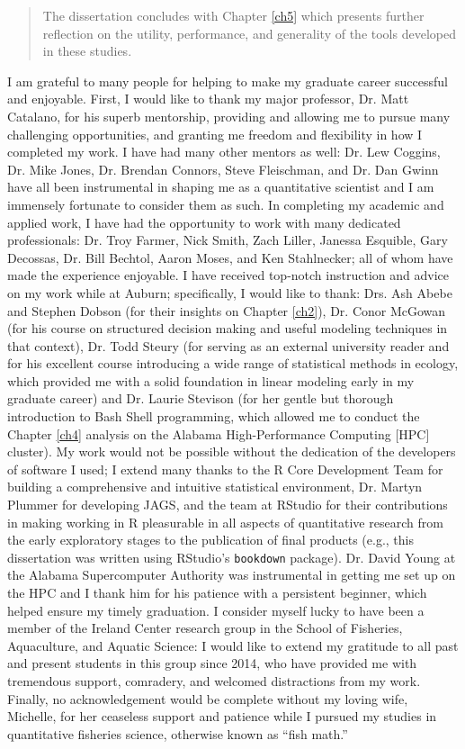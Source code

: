 \documentclass[12pt,]{book}
\theoremstyle{definition}
\theoremstyle{definition}
\theoremstyle{definition}
\theoremstyle{remark}
\begin{document}
\begin{romanpages}
\begin{abstract}
The dissertation concludes with Chapter \ref{ch5} which presents further reflection on the utility, performance, and generality of the tools developed in these studies.

\end{abstract}

\begin{acknowledgments}
\noindent
I am grateful to many people for helping to make my graduate career successful and enjoyable. First, I would like to thank my major professor, Dr. Matt Catalano, for his superb mentorship, providing and allowing me to pursue many challenging opportunities, and granting me freedom and flexibility in how I completed my work. I have had many other mentors as well: Dr. Lew Coggins, Dr. Mike Jones, Dr. Brendan Connors, Steve Fleischman, and Dr. Dan Gwinn have all been instrumental in shaping me as a quantitative scientist and I am immensely fortunate to consider them as such. In completing my academic and applied work, I have had the opportunity to work with many dedicated professionals: Dr. Troy Farmer, Nick Smith, Zach Liller, Janessa Esquible, Gary Decossas, Dr. Bill Bechtol, Aaron Moses, and Ken Stahlnecker; all of whom have made the experience enjoyable. I have received top-notch instruction and advice on my work while at Auburn; specifically, I would like to thank: Drs. Ash Abebe and Stephen Dobson (for their insights on Chapter \ref{ch2}), Dr. Conor McGowan (for his course on structured decision making and useful modeling techniques in that context), Dr. Todd Steury (for serving as an external university reader and for his excellent course introducing a wide range of statistical methods in ecology, which provided me with a solid foundation in linear modeling early in my graduate career) and Dr. Laurie Stevison (for her gentle but thorough introduction to Bash Shell programming, which allowed me to conduct the Chapter \ref{ch4} analysis on the Alabama High-Performance Computing [HPC] cluster). My work would not be possible without the dedication of the developers of software I used; I extend many thanks to the R Core Development Team for building a comprehensive and intuitive statistical environment, Dr. Martyn Plummer for developing JAGS, and the team at RStudio for their contributions in making working in R pleasurable in all aspects of quantitative research from the early exploratory stages to the publication of final products (e.g., this dissertation was written using RStudio’s \texttt{bookdown} package). Dr. David Young at the Alabama Supercomputer Authority was instrumental in getting me set up on the HPC and I thank him for his patience with a persistent beginner, which helped ensure my timely graduation. I consider myself lucky to have been a member of the Ireland Center research group in the School of Fisheries, Aquaculture, and Aquatic Science: I would like to extend my gratitude to all past and present students in this group since 2014, who have provided me with tremendous support, comradery, and welcomed distractions from my work. Finally, no acknowledgement would be complete without my loving wife, Michelle, for her ceaseless support and patience while I pursued my studies in quantitative fisheries science, otherwise known as ``fish math.''

\end{acknowledgments}
\end{romanpages}
\end{document}
